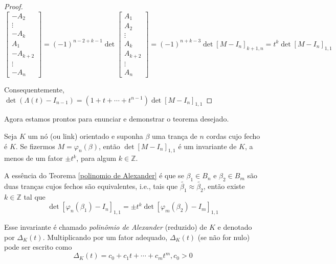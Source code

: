 \begin{proof}
\begin{equation*}
\begin{bmatrix}
		-A_2 \\
		\vdots\\
		-A_k\\
		A_1\\
		-A_{k+2}\\
		\vdots\\
		-A_n
		\end{bmatrix} = (-1)^{n-2+k-1}\det\begin{bmatrix}
		A_1\\
		A_2\\
		\vdots\\
		A_k\\
		A_{k+2}\\
		\vdots\\
		A_n
		\end{bmatrix} = (-1)^{n+k-3}\det[M - I_n]_{k+1, n} = t^k\det[M - I_n]_{1,1}
		\end{equation*}
		\par\vspace{0.3cm} Consequentemente, $\det(\Lambda(t) - I_{n-1}) = (1+t+\cdots+t^{n-1})\det[M - I_n]_{1,1}$	
	\end{proof}
	\par\vspace{0.3cm} Agora estamos prontos para enunciar e demonstrar o teorema desejado.
	\begin{theorem}
		\label{polinomio de Alexander}
		Seja $K$ um nó (ou link) orientado e suponha $\beta$ uma trança de $n$ cordas cujo fecho é $K$. Se fizermos $M = \varphi_n(\beta)$, então $\det[M - I_n]_{1,1}$ é um invariante de $K$, a menos de um fator $\pm t^k$, para algum $k\in\mathbb{Z}$.
	\end{theorem} 
	\par\vspace{0.3cm} A essência do Teorema \eqref{polinomio de Alexander} é que se $\beta_1\in B_n$ e $\beta_2\in B_m$ são duas tranças cujos fechos são equivalentes, i.e., tais que $\widetilde{\beta_1}\approx\widetilde{\beta_2}$, então existe $k\in\mathbb{Z}$ tal que
	\begin{equation*}
	\det[\varphi_n(\beta_1) - I_n]_{1,1}=\pm t^k\det[\varphi_m(\beta_2) - I_m]_{1,1}
	\end{equation*}
	\par\vspace{0.3cm} Esse invariante é chamado \textit{polinômio de Alexander} (reduzido) de $K$ e denotado por $\Delta_K(t)$. Multiplicando por um fator adequado, $\Delta_K(t)$ (se não for nulo) pode ser escrito como
	\begin{equation*}
	\Delta_K(t) = c_0 + c_1t + \cdots + c_mt^m, c_0>0
	\end{equation*}
